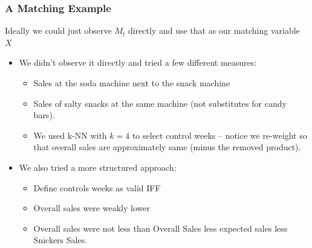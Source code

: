 \documentclass[xcolor=pdftex,dvipsnames,table,mathserif,aspectratio=169]{beamer}
\begin{document}
\begin{frame}
\frametitle{A Matching Example}
Ideally we could just observe $M_t$ directly and use that as our matching variable $X$
\begin{itemize}
\item We didn't observe it directly and tried a few different measures:
\begin{itemize}
\item Sales at the soda machine next to the snack machine
\item Sales of salty snacks at the same machine (not substitutes for candy bars).
\item We used k-NN with $k=4$ to select control weeks -- notice we re-weight so that overall sales are approximately same (minus the removed product).
\end{itemize}
\item We also tried a more structured approach:
\begin{itemize}
\item Define controls weeks as valid IFF
\item Overall sales were weakly lower
\item Overall sales were not less than Overall Sales less expected sales less Snickers Sales.
\end{itemize}
\end{itemize}
\end{frame}
\end{document}
